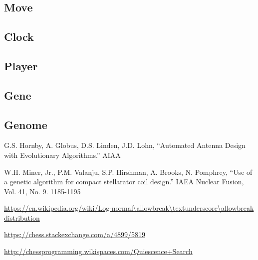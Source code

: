 \documentclass[letterpaper]{article}
\renewcommand{\_}{\allowbreak\textunderscore\allowbreak}
\begin{document}
\subsection{Move}

\subsection{Clock}

\subsection{Player}

\subsection{Gene}

\subsection{Genome}



\begin{thebibliography}{9}

G.S. Hornby, A. Globus, D.S. Linden, J.D. Lohn, ``Automated Antenna Design with Evolutionary Algorithms.'' AIAA

W.H. Miner, Jr., P.M. Valanju, S.P. Hirshman, A. Brooks, N. Pomphrey, ``Use of a genetic algorithm for compact stellarator coil design.'' IAEA Nuclear Fusion, Vol. 41, No. 9. 1185-1195

\url{https://en.wikipedia.org/wiki/Log-normal\_distribution}

\url{https://chess.stackexchange.com/a/4899/5819}

\url{http://chessprogramming.wikispaces.com/Quiescence+Search}

\end{thebibliography}
\end{document}
